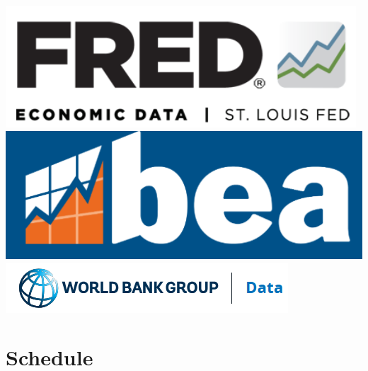 \documentclass[11pt]{article}
\begin{document}
	\begin{center} 
		\begin{minipage}{\linewidth}
			\begin{center}
				\includegraphics[width=0.2\linewidth]{f} 
				\hspace{0.5in}	\includegraphics[width=0.2\linewidth]{b}
				\hspace{0.5in}	\includegraphics[width=0.2\linewidth]{w}
			\end{center}
		\end{minipage}
	\end{center}
	
	\pagebreak 
	
		\pagebreak
	
	\section{Schedule}
	
	\small
	
\end{document}
